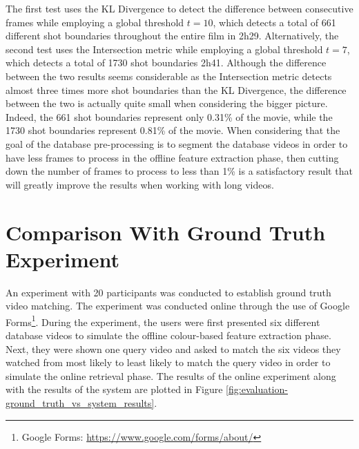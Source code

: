 The first test uses the KL Divergence to detect the difference between consecutive frames while employing a global threshold $t=10$, which detects a total of 661 different shot boundaries throughout the entire film in 2h29. Alternatively, the second test uses the Intersection metric while employing a global threshold $t=7$, which detects a total of 1730 shot boundaries 2h41. Although the difference between the two results seems considerable as the Intersection metric detects almost three times more shot boundaries than the KL Divergence, the difference between the two is actually quite small when considering the bigger picture. Indeed, the 661 shot boundaries represent only 0.31\% of the movie, while the 1730 shot boundaries represent 0.81\% of the movie. When considering that the goal of the database pre-processing is to segment the database videos in order to have less frames to process in the offline feature extraction phase, then cutting down the number of frames to process to less than 1\% is a satisfactory result that will greatly improve the results when working with long videos.\\



\section{Comparison With Ground Truth Experiment}

An experiment with 20 participants was conducted to establish ground truth video matching. The experiment was conducted online through the use of Google Forms\footnote{Google Forms: \url{https://www.google.com/forms/about/}}. During the experiment, the users were first presented six different database videos to simulate the offline colour-based feature extraction phase. Next, they were shown one query video and asked to match the six videos they watched from most likely to least likely to match the query video in order to simulate the online retrieval phase. The results of the online experiment along with the results of the system are plotted in Figure \ref{fig:evaluation-ground_truth_vs_system_results}.

